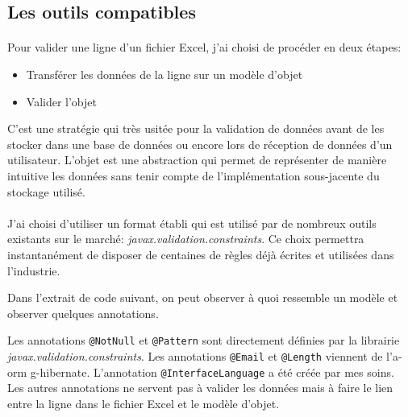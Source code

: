 \subsection{Les outils compatibles}
\label{subsec:compatible-tools}

\paragraph{}
Pour valider une ligne d'un fichier Excel, j'ai choisi de procéder en deux étapes:
\begin{itemize}
    \item Transférer les données de la ligne sur un modèle d'objet
    \item Valider l'objet
\end{itemize}
C'est une stratégie qui très usitée pour la validation de données avant de les stocker dans une base de données ou encore lors de réception de données d'un utilisateur.
L'objet est une abstraction qui permet de représenter de manière intuitive les données sans tenir compte de l'implémentation sous-jacente du stockage utilisé.

\paragraph{}
J'ai choisi d'utiliser un format établi qui est utilisé par de nombreux outils existants sur le marché: \textit{javax.validation.constraints}.
Ce choix permettra instantanément de disposer de centaines de règles déjà écrites et utilisées dans l'industrie.

Dans l'extrait de code suivant, on peut observer à quoi ressemble un modèle et observer quelques annotations.

Les annotations \lstinline{@NotNull} et \lstinline{@Pattern} sont directement définies par la librairie \textit{javax.validation.constraints}.
Les annotations \lstinline{@Email} et \lstinline{@Length} viennent de l'\gls{a-orm} \Gls{g-hibernate}.
L'annotation \lstinline{@InterfaceLanguage} a été créée par mes soins.
Les autres annotations ne servent pas à valider les données mais à faire le lien entre la ligne dans le fichier Excel et le modèle d'objet.
